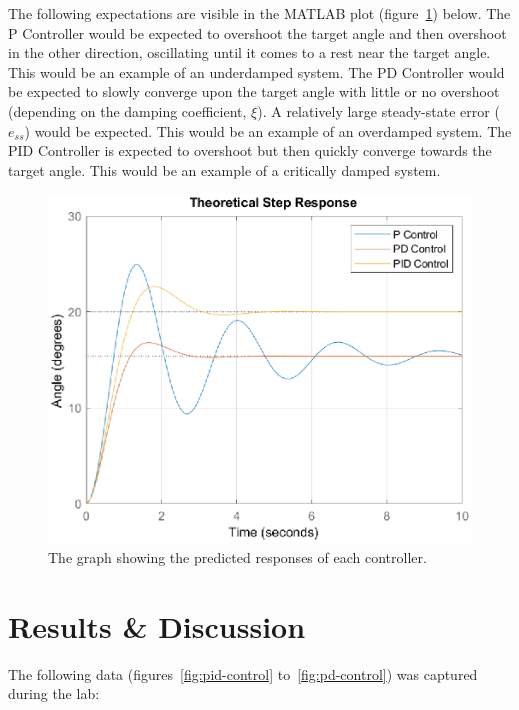 \documentclass[12pt]{article} %
\begin{document}
\noindent The following expectations are visible in the MATLAB plot (figure\ \ref{fig:prelab}) below. The P Controller would be expected to overshoot the target angle and then overshoot in the other direction, oscillating until it comes to a rest near the target angle. This would be an example of an underdamped system.
The PD Controller would be expected to slowly converge upon the target angle with little or no overshoot (depending on the damping coefficient, $\xi$). A relatively large steady-state error ($e_{ss}$) would be expected. This would be an example of an overdamped system.
The PID Controller is expected to overshoot but then quickly converge towards the target angle. This would be an example of a critically damped system.
\begin{figure}[H]
	\centering
	\includegraphics[scale=0.8]{prelab}
	\caption{The graph showing the predicted responses of each controller.}
	\label{fig:prelab}
\end{figure}

\section{Results \& Discussion}

\noindent The following data (figures\ \ref{fig:pid-control} to\ \ref{fig:pd-control}) was captured during the lab:
\end{document}
